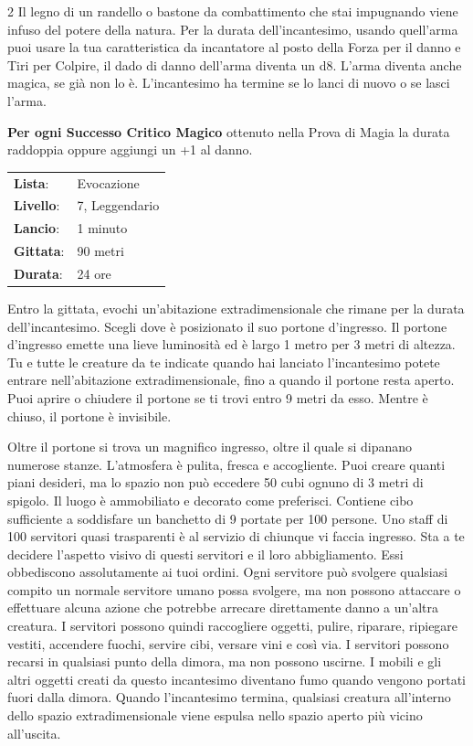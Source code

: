 \begin{multicols}{2}
Il legno di un randello o bastone da combattimento che stai impugnando viene infuso del potere della natura. Per la durata dell'incantesimo, usando quell'arma puoi usare la tua caratteristica da incantatore al posto della Forza per il danno e Tiri per Colpire, il dado di danno dell'arma diventa un d8. L'arma diventa anche magica, se già non lo è. L'incantesimo ha termine se lo lanci di nuovo o se lasci l'arma.

\textbf{Per ogni Successo Critico Magico} ottenuto nella Prova di Magia la durata raddoppia oppure aggiungi un +1 al danno.

\noindent\begin{tabularx}{\linewidth}{p{1.9cm}X}
	\rowcolor{gray!20}\textbf{Lista}: & Evocazione \\
	\textbf{Livello}: & 7, Leggendario \\
	\rowcolor{gray!20}\textbf{Lancio}: & 1 minuto \\
	\textbf{Gittata}: & 90 metri \\
	\rowcolor{gray!20}\textbf{Durata}: & 24 ore \\
\end{tabularx}\smallskip

Entro la gittata, evochi un'abitazione extradimensionale che rimane per la durata dell'incantesimo. Scegli dove è posizionato il suo portone d'ingresso. Il portone d'ingresso emette una lieve luminosità ed è largo 1 metro per 3 metri di altezza. Tu e tutte le creature da te indicate quando hai lanciato l'incantesimo potete entrare nell'abitazione extradimensionale, fino a quando il portone resta aperto. Puoi aprire o chiudere il portone se ti trovi entro 9 metri da esso. Mentre è chiuso, il portone è invisibile.

Oltre il portone si trova un magnifico ingresso, oltre il quale si dipanano numerose stanze. L'atmosfera è pulita, fresca e accogliente. Puoi creare quanti piani desideri, ma lo spazio non può eccedere 50 cubi ognuno di 3 metri di spigolo. Il luogo è ammobiliato e decorato come preferisci. Contiene cibo sufficiente a soddisfare un banchetto di 9 portate per 100 persone. Uno staff di 100 servitori quasi trasparenti è al servizio di chiunque vi faccia ingresso. Sta a te decidere l'aspetto visivo di questi servitori e il loro abbigliamento. Essi obbediscono assolutamente ai tuoi ordini. Ogni servitore può svolgere qualsiasi compito un normale servitore umano possa svolgere, ma non possono attaccare o effettuare alcuna azione che potrebbe arrecare direttamente danno a un'altra creatura. I servitori possono quindi raccogliere oggetti, pulire, riparare, ripiegare vestiti, accendere fuochi, servire cibi, versare vini e così via. I servitori possono recarsi in qualsiasi punto della dimora, ma non possono uscirne. I mobili e gli altri oggetti creati da questo incantesimo diventano fumo quando vengono portati fuori dalla dimora. Quando l'incantesimo termina, qualsiasi creatura all'interno dello spazio extradimensionale viene espulsa nello spazio aperto più vicino all'uscita.


\end{multicols}
